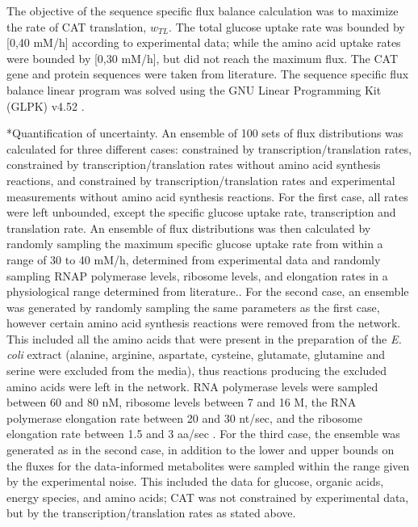 \documentclass[12pt]{article}
\makeatletter
\renewcommand\subsubsection{\@startsection
	{subsubsection}{2}{0mm}
	{-0.05in}
	{-0.5\baselineskip}
	{\normalfont\normalsize\itshape}}
\makeatother
\begin{document}
The objective of the sequence specific flux balance calculation was to maximize the rate of CAT translation, $w_{TL}$.
The total glucose uptake rate was bounded by [0,40 mM/h] according to experimental data;
while the amino acid uptake rates were bounded by [0,30 mM/h], but did not reach the maximum flux.
The CAT gene and protein sequences were taken from literature.
The sequence specific flux balance linear program was solved using the GNU Linear Programming Kit (GLPK) v4.52 \cite{GLPK}.


\subsubsection*{Quantification of uncertainty.}
An ensemble of 100 sets of flux distributions was calculated for three different cases:  constrained by transcription/translation rates, constrained by transcription/translation rates without amino acid synthesis reactions, and constrained by transcription/translation rates and experimental measurements without amino acid synthesis reactions.
For the first case, all rates were left unbounded, except the specific glucose uptake rate, transcription and translation rate.
An ensemble of flux distributions was then calculated by randomly sampling the maximum specific glucose uptake rate from within a range of 30 to 40 mM/h, determined from experimental data and randomly sampling RNAP polymerase levels, ribosome levels, and elongation rates in a physiological range determined from literature..
For the second case, an ensemble was generated by randomly sampling the same parameters as the first case, however certain amino acid synthesis reactions were removed from the network.
This included all the amino acids that were present in the preparation of the \textit{E. coli} extract (alanine, arginine, aspartate, cysteine, glutamate, glutamine and serine were excluded from the media), thus reactions producing the excluded amino acids were left in the network. 
RNA polymerase levels were sampled between 60 and 80 nM, ribosome levels between 7 and 16 \textmu M, the RNA polymerase elongation rate between 20 and 30 nt/sec, and the ribosome elongation rate between 1.5 and 3 aa/sec \cite{2005_underwood_biotech, Garamella:2016aa}.
For the third case, the ensemble was generated as in the second case, in addition to the lower and upper bounds on the fluxes for the data-informed metabolites were sampled within the range given by the experimental noise.
This included the data for glucose, organic acids, energy species, and amino acids; CAT was not constrained by experimental data, but by the transcription/translation rates as stated above.
\end{document}
